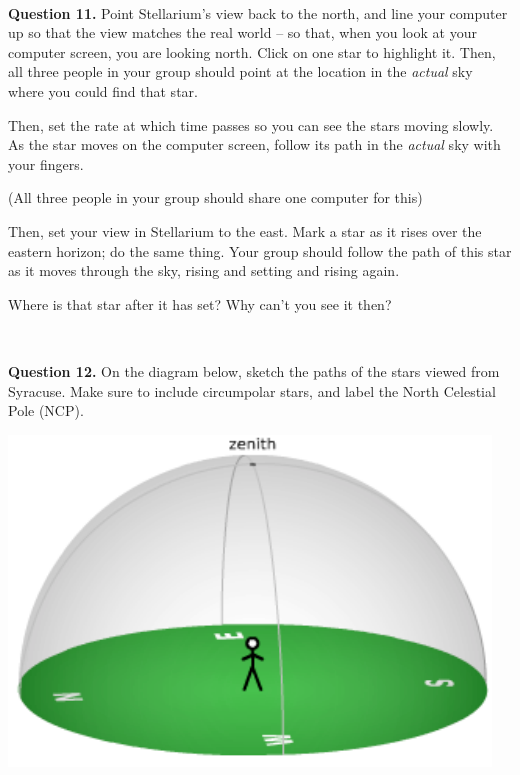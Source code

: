 \documentclass[11pt]{article}
\begin{document}
\hrulefill\\

\textbf{Question 11.} Point Stellarium's view back to the north, and line your computer up so that the view matches the real world --
so that, when you look at your computer screen, you are looking north. Click on one star to highlight it. Then, all three people
in your group should point at the location in the {\it actual} sky where you could find that star. 

Then, set the rate at which time passes so you can see the stars moving slowly. As the star moves on the computer screen, follow
its path in the {\it actual} sky with your fingers.

(All three people in your group should share one computer for this)

Then, set your view in Stellarium to the east. Mark a star as it rises over the eastern horizon; do the same thing. Your group
should follow the path of this star as it moves through the sky, rising and setting and rising again.

Where is that star after it has set? Why can't you see it then?
\vspace*{1.5cm}

\hrulefill\\



\newpage

\textbf{Question 12.} On the diagram below, sketch the paths of the stars viewed from Syracuse. Make sure to include circumpolar stars, and label the North Celestial Pole (NCP). \\
\vspace*{1.5cm}

\begin{center}
	\includegraphics{local_sky}
\end{center}
\end{document}
